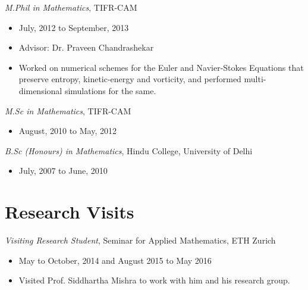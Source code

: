 \documentclass[margin]{res}
\begin{document}
\begin{resume}
\begin{itemize}
 \end{itemize}

 {\it M.Phil in Mathematics}, TIFR-CAM
 \begin{itemize} \itemsep -2pt  %
 \item July, 2012 to September, 2013
 \item Advisor: Dr. Praveen Chandrashekar
 \item Worked on numerical schemes for the Euler and Navier-Stokes Equations that preserve entropy, kinetic-energy and vorticity, and performed multi-dimensional simulations for the same.
 \end{itemize}

 {\it M.Sc in Mathematics}, TIFR-CAM
 \begin{itemize} \itemsep -2pt  %
 \item August, 2010 to May, 2012
 \end{itemize}
 
 {\it B.Sc (Honours) in Mathematics}, Hindu College, University of Delhi
 \begin{itemize} \itemsep -2pt  %
 \item July, 2007 to June, 2010
 \end{itemize}
 
% 

\section{Research Visits}
 {\it Visiting Research Student}, Seminar for Applied Mathematics, ETH Zurich
 \begin{itemize} \itemsep -2pt  %
 \item May to October, 2014 and August 2015 to May 2016            
 \item Visited Prof. Siddhartha Mishra to work with him and his research group.
 \end{itemize}


\end{resume}
\end{document}
